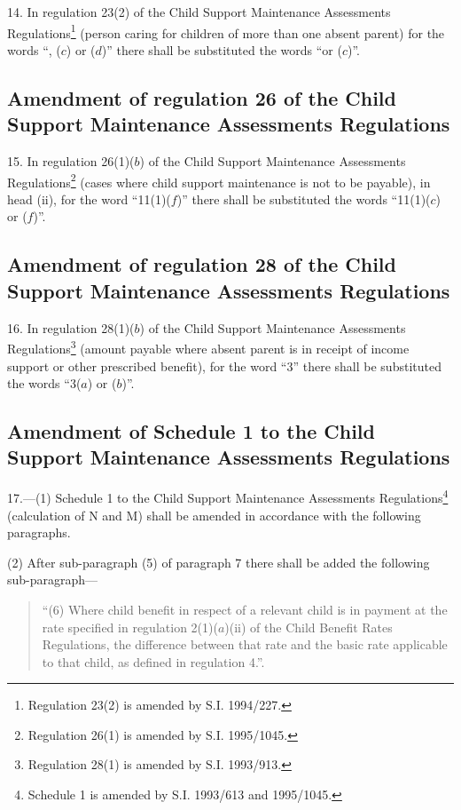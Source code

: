 \documentclass[12pt,a4paper]{article}
\begin{document}
14.  In regulation 23(2) of the Child Support Maintenance Assessments Regulations\footnote{\frenchspacing Regulation 23(2) is amended by S.I. 1994/227.} (person caring for children of more than one absent parent) for the words “, ($c$) or ($d$)” there shall be substituted the words “or ($c$)”.

\subsection[15. Amendment of regulation 26 of the Child Support Maintenance Assessments Regulations]{\sloppy Amendment of regulation 26 of the Child Support Maintenance Assessments Regulations}

15.  In regulation 26(1)($b$) of the Child Support Maintenance Assessments Regulations\footnote{\frenchspacing Regulation 26(1) is amended by S.I. 1995/1045.} (cases where child support maintenance is not to be payable), in head (ii), for the word “11(1)($f$)” there shall be substituted the words “11(1)($c$) or ($f$)”.

\subsection[16. Amendment of regulation 28 of the Child Support Maintenance Assessments Regulations]{\sloppy Amendment of regulation 28 of the Child Support Maintenance Assessments Regulations}

16.  In regulation 28(1)($b$) of the Child Support Maintenance Assessments Regulations\footnote{\frenchspacing Regulation 28(1) is amended by S.I. 1993/913.} (amount payable where absent parent is in receipt of income support or other prescribed benefit), for the word “3” there shall be substituted the words “3($a$) or ($b$)”.

\subsection[17. Amendment of Schedule 1 to the Child Support Maintenance Assessments Regulations]{Amendment of Schedule 1 to the Child Support Maintenance Assessments Regulations}

17.—(1) Schedule 1 to the Child Support Maintenance Assessments Regulations\footnote{\frenchspacing Schedule 1 is amended by S.I. 1993/613 and 1995/1045.} (calculation of N and M) shall be amended in accordance with the following paragraphs.

(2) After sub-paragraph (5) of paragraph 7 there shall be added the following sub-paragraph—
\begin{quotation}
“(6) Where child benefit in respect of a relevant child is in payment at the rate specified in regulation 2(1)($a$)(ii) of the Child Benefit Rates Regulations, the difference between that rate and the basic rate applicable to that child, as defined in regulation 4.”.
\end{quotation}
\end{document}

